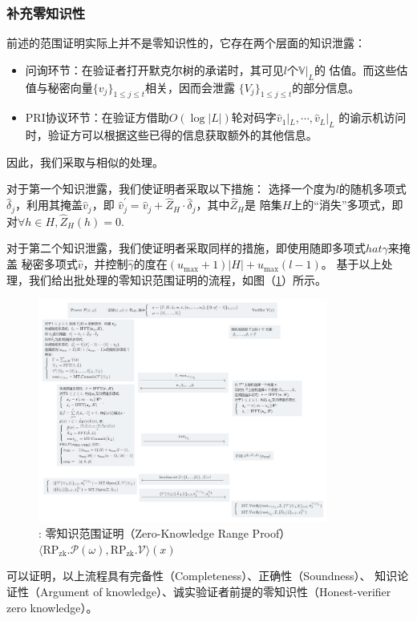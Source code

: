 \documentclass[zihao=-4]{ctexart}
\begin{document}
\begin{spacing}{1.5}
\subsubsection{补充零知识性}
前述的范围证明实际上并不是零知识性的，它存在两个层面的知识泄露：
\begin{itemize}
  \item 问询环节：在验证者打开默克尔树的承诺时，其可见$l$个$\mathbb{V}|_L$的
        估值。而这些估值与秘密向量$\{v_j\}_{1\le j\le t}$相关，因而会泄露
        $\{V_j\}_{1\le j\le t}$的部分信息。
  \item PRI协议环节：在验证方借助$O(\log{|L|})$轮对码字$\hat{v}_1|_L,\cdots,\hat{v}_L|_L$
        的谕示机访问时，验证方可以根据这些已得的信息获取额外的其他信息。
\end{itemize}\par
因此，我们采取与相似的处理。\par
对于第一个知识泄露，我们使证明者采取以下措施：
选择一个度为$l$的随机多项式$\hat{\delta}_j$，利用其掩盖$\hat{v}_j$，即
$\hat{v}^{\prime}_j=\hat{v}_j+\hat{Z}_H\cdot\hat{\delta}_j$，其中$\hat{Z}_H$是
陪集$H$上的“消失”多项式，即对$\forall h\in H,\hat{Z}_H(h)=0$.\par
对于第二个知识泄露，我们使证明者采取同样的措施，即使用随即多项式$hat{\gamma}$来掩盖
秘密多项式$\hat{v}$，并控制$\hat{\gamma}$的度在$(u_{\max}+1)|H|+u_{\max}(l-1)$。
基于以上处理，我们给出批处理的零知识范围证明的流程，如图（\ref{ZKRP流程}）所示。
\begin{figure}[H]
  \centering
  \includegraphics[width=0.85\textwidth]{./include_picture/ZKRP.png}
  \caption{: 零知识范围证明（Zero-Knowledge Range Proof）$\langle \text{RP}_{\text{zk}}.\mathcal{P}(\omega),\text{RP}_{\text{zk}}.\mathcal{V}\rangle(x)$}
  \label{ZKRP流程}
\end{figure}\par
可以证明，以上流程具有完备性（Completeness）、正确性（Soundness）、
知识论证性（Argument of knowledge）、诚实验证者前提的零知识性（Honest-verifier zero knowledge）。


\end{spacing}
\end{document}
